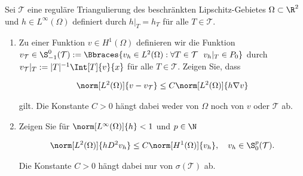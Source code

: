 
\begin{exercise}

Sei $\mathcal{T}$ eine reguläre Triangulierung des beschränkten Lipschitz-Gebietes $\Omega \subset \R^2$ und $h \in L^\infty(\Omega)$ definiert durch $h|_T = h_T$ für alle $T \in \mathcal{T}$.

\begin{enumerate}[label = \textbf{\alph*)}]
  \item Zu einer Funktion $v \in H^1(\Omega)$ definieren wir die Funktion $v_\mathcal{T} \in \S_{-1}^0(\mathcal{T}) := \Bbraces{v_h \in L^2(\Omega): \forall T \in \mathcal{T}~~ v_h|_T \in P_0}$ durch $v_\mathcal{T}|_T := |T|^{-1} \Int[T]{v}{x}$ für alle $T \in \mathcal{T}$. Zeigen Sie, dass

  \begin{align*}
    \norm[L^2(\Omega)]{v - v_\mathcal{T}}
    \leq
    C \norm[L^2(\Omega)]{h \nabla v}
  \end{align*}

  gilt. Die Konstante $C > 0$ hängt dabei weder von $\Omega$ noch von $v$ oder $\mathcal{T}$ ab.

  \item Zeigen Sie für $\norm[L^\infty(\Omega)]{h} < 1$ und $p \in \N$

  \begin{align}
    \norm[L^2(\Omega)]{h D^2v_h}
    \leq
    C \norm[H^1(\Omega)]{v_h}, \quad
    v_h \in \S_0^p(\mathcal{T}).
  \end{align}

  Die Konstante $C > 0$ hängt dabei nur von $\sigma(\mathcal{T})$ ab.
\end{enumerate}

\end{exercise}


